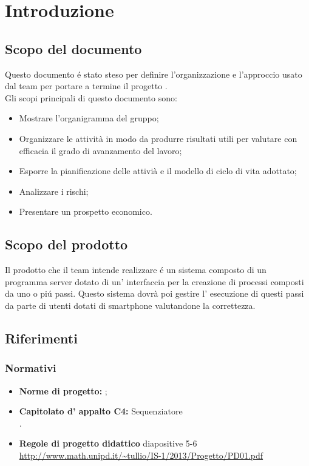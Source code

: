\section{Introduzione}
\subsection{Scopo del documento}
Questo documento \'e stato steso per definire l'organizzazione e l'approccio usato dal team \gruppo per portare a termine il progetto \progetto. \\
Gli scopi principali di questo documento sono:
\begin{itemize}
  \item Mostrare l'organigramma del gruppo;
  \item Organizzare le attività in modo da produrre risultati utili per 
valutare con efficacia il grado di avanzamento del lavoro;
  \item	Esporre la pianificazione delle attivià e il modello di ciclo di vita adottato;
  \item Analizzare i rischi;
  \item Presentare un prospetto economico.
\end{itemize}

\subsection{Scopo del prodotto}
Il prodotto che il team \gruppo intende realizzare \'e un sistema composto di un programma server dotato di un' interfaccia per la creazione di processi composti da uno o pi\'u passi. Questo sistema dovrà poi gestire l' esecuzione di questi passi da parte di utenti dotati di smartphone valutandone la correttezza.\\

\subsection{Riferimenti}

\subsubsection{Normativi}
\begin{itemize}
	\item \textbf{Norme di progetto:} \infoNDP ;
	\item \textbf{Capitolato d' appalto C4:} Sequenziatore\\ \capitolato .
	\item \textbf{Regole di progetto didattico} diapositive 5-6 \url{http://www.math.unipd.it/~tullio/IS-1/2013/Progetto/PD01.pdf} 
\end{itemize}
